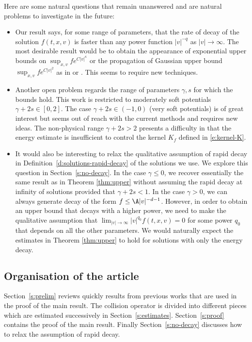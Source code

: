 Here are some natural questions that remain unanswered and are natural
problems to investigate in the future:
\begin{itemize}
\item Our result says, for some range of parameters, that the rate of
decay of the solution $f(t,x,v)$ is faster than any power function
$|v|^{-q}$ as $|v| \to \infty$. The most desirable result would be
to obtain the appearance of exponential upper bounds on
$\sup_{x,v} f e^{C|v|^\kappa}$ or the propagation of Gaussian upper
bound $\sup_{x,v} f e^{C |v|^2}$ as in
\cite{gamba-panferov-villani-2009} or \cite{css}. This seems to
require new techniques.
\item Another open problem regards the range of parameters $\gamma,s$
for which the bounds hold. This work is restricted to moderately
soft potentials $\gamma+2s \in [0,2]$. The case
$\gamma+2s \in (-1,0)$ (very soft potentials) is of great interest
but seems out of reach with the current methods and requires new
ideas. The non-physical range $\gamma+2s > 2$ presents a difficulty
in that the energy estimate is insufficient to control the kernel
$K_f$ defined in \eqref{e:kernel-K}.
\item It would also be interesting to relax the qualitative assumption
of rapid decay in Definition~\ref{d:solutions-rapid-decay} of the
solutions we use. We explore this question in
Section~\ref{s:no-decay}. In the case $\gamma \leq 0$, we recover
essentially the same result as in Theorem \ref{thm:upper} without
assuming the rapid decay at infinity of solutions provided that
$\gamma+2s < 1$. In the case $\gamma > 0$, we can always generate
decay of the form $f \leq \A |v|^{-d-1}$. However, in order to
obtain an upper bound that decays with a higher power, we need to
make the qualitative assumption that
$\lim_{|v| \to \infty} |v|^{q_0} f(t,x,v) = 0$ for some power $q_0$
that depends on all the other parameters. We would naturally expect
the estimates in Theorem \ref{thm:upper} to hold for solutions with
only the energy decay.
\end{itemize}

\subsection{Organisation of the article}
Section~\ref{s:prelim} reviews quickly results from previous works
that are used in the proof of the main result. The collision operator
is divided into different pieces which are estimated successively in
Section~\ref{s:estimates}. Section~\ref{s:proof} contains the proof of
the main result. Finally Section~\ref{s:no-decay} discusses how to
relax the assumption of rapid decay.

